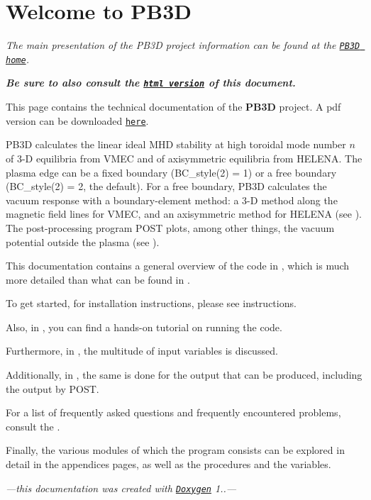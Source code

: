\chapter{Welcome to PB3D }
\hypertarget{index}{}\label{index}
{\itshape The main presentation of the PB3D project information can be found at the \href{https://pb3d.github.io}{\texttt{PB3D home}}.}

 
\textit{\textbf{Be sure to also consult the \href{https://pb3d.github.io/Doxygen/html/index.html}{\tt html version} of this document.}}


This page contains the technical documentation of the {\bfseries{PB3D}} project. A pdf version can be downloaded \href{https://pb3d.github.io/PB3D_manual.pdf}{\texttt{here}}.

PB3D calculates the linear ideal MHD stability at high toroidal mode number $n$ of 3-\/D equilibria from VMEC and of axisymmetric equilibria from HELENA. The plasma edge can be a fixed boundary ({\ttfamily BC\+\_\+style(2) = 1}) or a free boundary ({\ttfamily BC\+\_\+style(2) = 2}, the default). For a free boundary, PB3D calculates the vacuum response with a boundary-\/element method: a 3-\/D method along the magnetic field lines for VMEC, and an axisymmetric method for HELENA (see ). The post-\/processing program POST plots, among other things, the vacuum potential outside the plasma (see ).

This documentation contains a general overview of the code in , which is much more detailed than what can be found in .

To get started, for installation instructions, please see  instructions.

Also, in , you can find a hands-\/on tutorial on running the code.

Furthermore, in , the multitude of input variables is discussed.

Additionally, in , the same is done for the output that can be produced, including the output by POST.

For a list of frequently asked questions and frequently encountered problems, consult the .

  
Finally, the various modules of which the program consists can be explored in detail in the appendices pages, as well as the procedures and the variables.


\begin{center}{\itshape —this documentation was created with \href{http://www.doxygen.org/index.html}{\texttt{Doxygen}} 1..—}\end{center}  